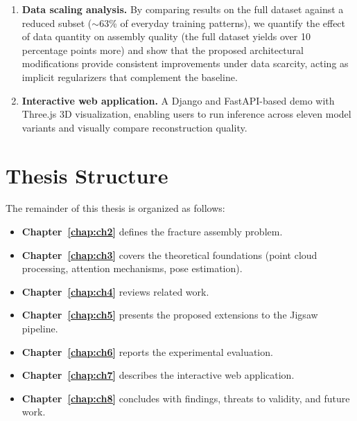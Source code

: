\begin{enumerate}
    \item \textbf{Data scaling analysis.} By comparing results on the full dataset against a reduced subset ($\sim$63\% of everyday training patterns), we quantify the effect of data quantity on assembly quality (the full dataset yields over 10 percentage points more) and show that the proposed architectural modifications provide consistent improvements under data scarcity, acting as implicit regularizers that complement the baseline.

    \item \textbf{Interactive web application.} A Django and FastAPI-based demo with Three.js 3D visualization, enabling users to run inference across eleven model variants and visually compare reconstruction quality.
\end{enumerate}

\section{Thesis Structure}

The remainder of this thesis is organized as follows:

\begin{itemize}
    \item \textbf{Chapter~\ref{chap:ch2}} defines the fracture assembly problem.

    \item \textbf{Chapter~\ref{chap:ch3}} covers the theoretical foundations (point cloud processing, attention mechanisms, pose estimation).

    \item \textbf{Chapter~\ref{chap:ch4}} reviews related work.

    \item \textbf{Chapter~\ref{chap:ch5}} presents the proposed extensions to the Jigsaw pipeline.

    \item \textbf{Chapter~\ref{chap:ch6}} reports the experimental evaluation.

    \item \textbf{Chapter~\ref{chap:ch7}} describes the interactive web application.

    \item \textbf{Chapter~\ref{chap:ch8}} concludes with findings, threats to validity, and future work.

\end{itemize}
